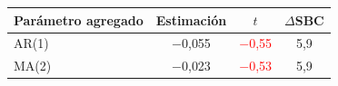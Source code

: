 \begin{tabular}{lccc}
\toprule
Par\'ametro agregado & Estimaci\'on & $t$ & $\Delta$SBC
\\ \midrule
AR(1) & \ensuremath{-}0{,}055 & \textcolor{red}{\ensuremath{-}0{,}55} & 5{,}9 \\
MA(2) & \ensuremath{-}0{,}023 & \textcolor{red}{\ensuremath{-}0{,}53} & 5{,}9 \\
\bottomrule
\end{tabular}
